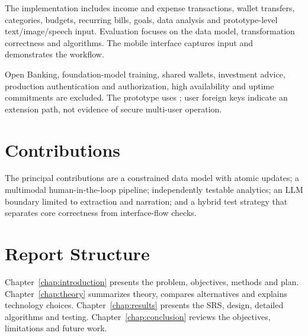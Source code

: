 The implementation includes income and expense transactions, wallet transfers, categories, budgets, recurring bills, goals, data analysis and prototype-level text/image/speech input. Evaluation focuses on the data model, transformation correctness and algorithms. The mobile interface captures input and demonstrates the workflow.

Open Banking, foundation-model training, shared wallets, investment advice, production authentication and authorization, high availability and uptime commitments are excluded. The prototype uses ; user foreign keys indicate an extension path, not evidence of secure multi-user operation.

\section{Contributions}

The principal contributions are a constrained data model with atomic updates; a multimodal human-in-the-loop pipeline; independently testable analytics; an LLM boundary limited to extraction and narration; and a hybrid test strategy that separates core correctness from interface-flow checks.

\section{Report Structure}

Chapter~\ref{chap:introduction} presents the problem, objectives, methods and plan. Chapter~\ref{chap:theory} summarizes theory, compares alternatives and explains technology choices. Chapter~\ref{chap:results} presents the SRS, design, detailed algorithms and testing. Chapter~\ref{chap:conclusion} reviews the objectives, limitations and future work.
